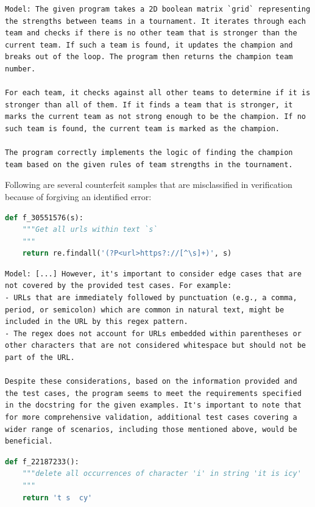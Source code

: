 \begin{lstlisting}[frame=single]
Model: The given program takes a 2D boolean matrix `grid` representing the strengths between teams in a tournament. It iterates through each team and checks if there is no other team that is stronger than the current team. If such a team is found, it updates the champion and breaks out of the loop. The program then returns the champion team number.

For each team, it checks against all other teams to determine if it is stronger than all of them. If it finds a team that is stronger, it marks the current team as not strong enough to be the champion. If no such team is found, the current team is marked as the champion.

The program correctly implements the logic of finding the champion team based on the given rules of team strengths in the tournament.
\end{lstlisting}


\noindent Following are several counterfeit samples that are misclassified in verification because of forgiving an identified error:

\begin{lstlisting}[language=python, frame=single]
def f_30551576(s):
    """Get all urls within text `s`
    """
    return re.findall('(?P<url>https?://[^\s]+)', s)
\end{lstlisting}
\begin{lstlisting}[frame=single]
Model: [...] However, it's important to consider edge cases that are not covered by the provided test cases. For example:
- URLs that are immediately followed by punctuation (e.g., a comma, period, or semicolon) which are common in natural text, might be included in the URL by this regex pattern.
- The regex does not account for URLs embedded within parentheses or other characters that are not considered whitespace but should not be part of the URL.

Despite these considerations, based on the information provided and the test cases, the program seems to meet the requirements specified in the docstring for the given examples. It's important to note that for more comprehensive validation, additional test cases covering a wider range of scenarios, including those mentioned above, would be beneficial.
\end{lstlisting}

\begin{lstlisting}[language=python, frame=single]
def f_22187233():
    """delete all occurrences of character 'i' in string 'it is icy'
    """
    return 't s  cy'
\end{lstlisting}

